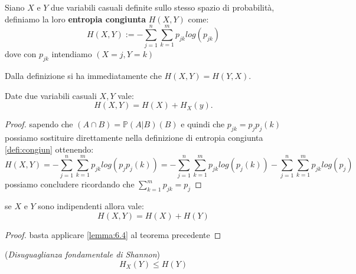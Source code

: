 \begin{defi} \label{defi:congiun}
Siano $X$ e $Y$ due variabili casuali definite sullo stesso spazio di probabilità, definiamo la loro \textbf{entropia congiunta} $H(X,Y)$ come:
\begin{equation}\label{eq:congiun}
H(X,Y):=-\sum_{j=1}^n\sum_{k=1}^m p_{jk}log(p_{jk})
\end{equation}
dove con $p_{jk}$ intendiamo \p$(X=j,Y=k)$
\end{defi}
\begin{oss}
Dalla definizione si ha immediatamente che $H(X,Y)=H(Y,X)$.
\end{oss}
\begin{teo} \label{teo:6.5}
Date due variabili casuali $X,Y$ vale:
\begin{equation}
H(X,Y)=H(X)+H_X(y).
\end{equation}
\end{teo}
\begin{proof}
sapendo che \p$(A \cap B)=\mathbb{P}(A|B)$\p$(B)$ e quindi che $p_{jk}=p_jp_j(k)$ possiamo sostituire direttamente nella definizione di entropia congiunta \ref{defi:congiun} ottenendo:
$$H(X,Y)=-\sum_{j=1}^n\sum_{k=1}^m p_{jk}log(p_{j}p_{j}(k))=-\sum_{j=1}^n\sum_{k=1}^m p_{jk}log(p_{j}(k))-\sum_{j=1}^n\sum_{k=1}^m p_{jk}log(p_{j})$$
possiamo concludere ricordando che $\sum_{k=1}^m p_{jk}=p_j$
\end{proof}
\begin{corol}
se $X$ e $Y$ sono indipendenti allora vale:
\begin{equation}
H(X,Y)=H(X)+H(Y)
\end{equation}
\end{corol}
\begin{proof}
basta applicare \ref{lemma:6.4} al teorema precedente
\end{proof}
\begin{teo} \label{teo:disugShannon}
(\textit{Disuguaglianza fondamentale di Shannon})\\
\begin{equation}
H_X(Y)\leq H(Y)
\end{equation}
\end{teo}
